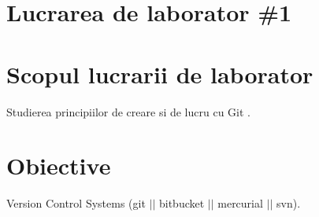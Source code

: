 
\section*{Lucrarea de laborator \#1}




\section{Scopul lucrarii de laborator}

Studierea principiilor de creare si de lucru cu Git  .

\section{Obiective}



Version Control Systems (git $||$ bitbucket $||$ mercurial $||$ svn).
       
